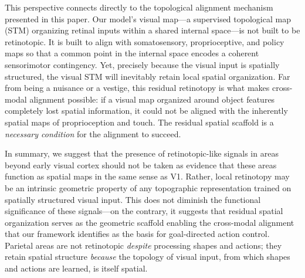 This perspective connects directly to the topological alignment mechanism presented
in this paper. Our model's visual map---a supervised topological map (STM)
organizing retinal inputs within a shared internal space---is not built to be
retinotopic. It is built to align with somatosensory, proprioceptive, and policy
maps so that a common point in the internal space encodes a coherent sensorimotor
contingency. Yet, precisely because the visual input is spatially structured,
the visual STM will inevitably retain local spatial organization. Far from being
a nuisance or a vestige, this residual retinotopy is what makes cross-modal
alignment possible: if a visual map organized around object features completely
lost spatial information, it could not be aligned with the inherently spatial
maps of proprioception and touch. The residual spatial scaffold is a
\emph{necessary condition} for the alignment to succeed.

In summary, we suggest that the presence of retinotopic-like signals in areas
beyond early visual cortex should not be taken as evidence that these areas
function as spatial maps in the same sense as V1. Rather, local retinotopy may
be an intrinsic geometric property of any topographic representation trained
on spatially structured visual input. This does not diminish the functional
significance of these signals---on the contrary, it suggests that residual
spatial organization serves as the geometric scaffold enabling the cross-modal
alignment that our framework identifies as the basis for goal-directed action
control. Parietal areas are not retinotopic \emph{despite} processing shapes
and actions; they retain spatial structure \emph{because} the topology of visual
input, from which shapes and actions are learned, is itself spatial.

